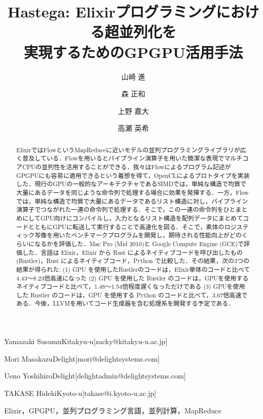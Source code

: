 \documentclass[submit,techrep]{ipsj}
\begin{document}
\title{Hastega: Elixirプログラミングにおける超並列化を\\実現するためのGPGPU活用手法}



\author{山崎 進}{Yamazaki Susumu}{Kitakyu-u}[zacky@kitakyu-u.ac.jp]
\author{森 正和}{Mori Masakazu}{Delight}[mori@delightsystems.com]
\author{上野 嘉大}{Ueno Yoshihiro}{Delight}[delightadmin@delightsystems.com]
\author{高瀬 英希}{TAKASE Hideki}{Kyoto-u}[takase@i.kyoto-u.ac.jp]

\begin{abstract}
ElixirではFlowというMapReduceに近いモデルの並列プログラミングライブラリが広く普及している．Flowを用いるとパイプライン演算子を用いた簡潔な表現でマルチコアCPUの並列性を活用することができる．我々はFlowによるプログラム記述がGPGPUにも容易に適用できるという着想を得て，OpenCLによるプロトタイプを実装した．現行のGPUの一般的なアーキテクチャであるSIMDでは，単純な構造で均質で大量にあるデータを同じような命令列で処理する場合に効果を発揮する．一方，Flowでは，単純な構造で均質で大量にあるデータであるリスト構造に対し，パイプライン演算子でつながれた一連の命令列で処理する．そこで，この一連の命令列をひとまとめにしてGPU向けにコンパイルし，入力となるリスト構造を配列データにまとめてコードとともにGPUに転送して実行することで高速化を図る．そこで，素体のロジスティック写像を用いたベンチマークプログラムを開発し，期待される性能向上がどのくらいになるかを評価した．Mac Pro (Mid 2010)と Google Compute Engine (GCE)で評価した．言語は Elixir，Elixir から Rust によるネイティブコードを呼び出したもの(Rustler)，Rust によるネイティブコード，Python で比較した．その結果，次の3つの結果が得られた: (1) GPU を使用したRustlerのコードは，Elixir単体のコードと比べて4.43〜8.23倍高速になった (2) GPU を使用した Rustler のコードは，GPUを使用するネイティブコードと比べて，1.48〜1.54倍程度遅くなっただけである (3) GPUを使用した Rustler のコードは，GPU を使用する Python のコードと比べて，3.67倍高速である．今後，LLVMを用いてコード生成器を含む処理系を開発する予定である．
\end{abstract}


\begin{jkeyword}
Elixir，GPGPU，並列プログラミング言語，並列計算，MapReduce
\end{jkeyword}
\end{document}
